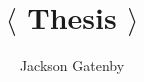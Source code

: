 



\title{$\langle$ Thesis $\rangle$}
\author{Jackson Gatenby}
\maketitle

\tableofcontents








